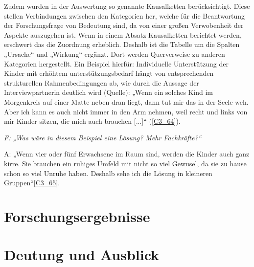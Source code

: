 Zudem wurden in der Auswertung so genannte Kausalketten berücksichtigt. Diese stellen Verbindungen zwischen den Kategorien her, welche für die Beantwortung der Forschungsfrage von Bedeutung sind, da von einer großen Verwobenheit der Aspekte auszugehen ist. Wenn in einem Absatz Kausalketten berichtet werden, erschwert das die Zuordnung erheblich. Deshalb ist die Tabelle um die Spalten „Ursache“ und „Wirkung“ ergänzt. Dort werden Querverweise zu anderen Kategorien hergestellt. Ein Beispiel hierfür: Individuelle Unterstützung der Kinder mit erhöhtem unterstützungsbedarf hängt von entsprechenden strukturellen Rahmenbedingungen ab, wie durch die Aussage der Interviewpartnerin deutlich wird (Quelle): „Wenn ein solches Kind im Morgenkreis auf einer Matte neben dran liegt, dann tut mir das in der Seele weh. Aber ich kann es auch nicht immer in den Arm nehmen, weil recht und links von mir Kinder sitzen, die mich auch brauchen [...]“ (\ref{C3_64}). 

\emph{F: „Was wäre in diesem Beispiel eine Lösung? Mehr Fachkräfte?“}

A: „Wenn vier oder fünf Erwachsene im Raum sind, werden die Kinder auch ganz kirre. Sie brauchen ein ruhiges Umfeld mit nicht so viel Gewusel, da sie zu hause schon so viel Unruhe haben. Deshalb sehe ich die Lösung in kleineren Gruppen“\ref{C3_65}.

\section{Forschungsergebnisse}
\section{Deutung und Ausblick}       
 
